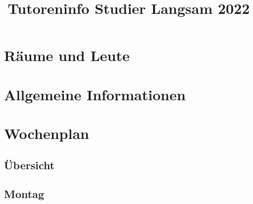 \documentclass[10pt,twocolumn,ngerman]{scrartcl}
\begin{document}

\title{\vspace{-1em}
    Tutoreninfo Studier Langsam 2022\vspace{-0.8em}
}
\maketitle

\section{Räume und Leute}


\section{Allgemeine Informationen}


\section{Wochenplan}

\subsection{Übersicht}




\subsection{Montag}
\end{document}
